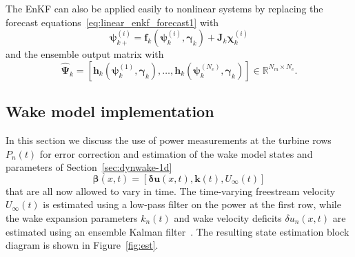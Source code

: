 The EnKF can also be applied easily to nonlinear systems by replacing the forecast equations~\eqref{eq:linear_enkf_forecast1} with 
\begin{equation}
\label{eq:nonlinear_enkf_forecast1}
\boldsymbol{\psi}_{k+}^{(i)} = \mathbf{f}_k( \boldsymbol{\psi}_k^{(i)}, \boldsymbol{\gamma}_k) + \mathbf{J}_k\boldsymbol{\chi}_k^{(i)}
\end{equation}
and the ensemble output matrix with
\begin{equation}
\hat{\boldsymbol \Psi }_k = \left[\mathbf{h}_k (\boldsymbol{\psi}^{(1)}_k, \boldsymbol{\gamma}_k), \hdots,\mathbf{h}_k (\boldsymbol{\psi}^{(N_e)}_k, \boldsymbol{\gamma}_k) \right] \in \mathbb{R}^{N_m \times N_e}.
\end{equation}

\subsection{Wake model implementation}
\label{subsec:estimation-ensemble-wake}
In this section we discuss the use of power measurements at the turbine rows $P_n(t)$ for error correction and estimation of the wake model states and parameters of Section~\ref{sec:dynwake-1d}
\begin{equation}
\boldsymbol{\beta}(x,t) = \left[ \boldsymbol{\delta} \mathbf{u}(x,t), \mathbf{k}(t), U_\infty(t)\right]
\end{equation} 
that are all now allowed to vary in time. The time-varying freestream velocity $U_\infty(t)$ is estimated using a low-pass filter on the power at the first row, while the wake expansion parameters $k_n(t)$ and wake velocity deficits $\delta u_n(x,t)$ are estimated using an ensemble Kalman filter~\cite{Evensen2003a}. The resulting state estimation block diagram is shown in Figure~\ref{fig:est}.

